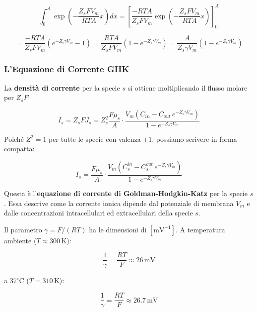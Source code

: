 \begin{equation}
\int_0^A \exp\left(-\frac{Z_s F V_m}{RT A}x\right)dx = \left[\frac{-RT A}{Z_s F V_m}\exp\left(-\frac{Z_s F V_m}{RT A}x\right)\right]_0^A
\end{equation}

\begin{equation}
= \frac{-RT A}{Z_s F V_m}\left(e^{-Z_s \gamma V_m} - 1\right) = \frac{RT A}{Z_s F V_m}\left(1 - e^{-Z_s \gamma V_m}\right) = \frac{A}{Z_s \gamma V_m}\left(1 - e^{-Z_s \gamma V_m}\right)
\end{equation}

\subsubsection{L'Equazione di Corrente GHK}

La \textbf{densità di corrente} per la specie $s$ si ottiene moltiplicando il flusso molare per $Z_s F$:

\begin{equation}
I_s = Z_s F J_s = Z_s^2 \frac{F \mu_s}{A} \cdot \frac{ V_m \left(C_{in} - C_{out}\,e^{-Z_s \gamma V_m}\right)}{1 - e^{-Z_s \gamma V_m}}
\end{equation}

Poiché $Z^2 = 1$ per tutte le specie con valenza $\pm 1$, possiamo scrivere in forma compatta:

\begin{equation}
\boxed{I_s = \frac{F \mu_s}{A} \cdot \frac{ V_m \left(C_s^{in} - C_s^{out}\,e^{-Z_s \gamma V_m}\right)}{1 - e^{-Z_s \gamma V_m}}}
\end{equation}

Questa è l'\textbf{equazione di corrente di Goldman-Hodgkin-Katz} per la specie $s$. Essa descrive come la corrente ionica dipende dal potenziale di membrana $V_m$ e dalle concentrazioni intracellulari ed extracellulari della specie $s$.

Il parametro $\gamma = F/(RT)$ ha le dimensioni di $[\text{mV}^{-1}]$. A temperatura ambiente ($T \approx 300\,\text{K}$):

\begin{equation}
\frac{1}{\gamma} = \frac{RT}{F} \approx 26\,\text{mV}
\end{equation}

a $37^\circ\text{C}$ ($T = 310\,\text{K}$):

\begin{equation}
\frac{1}{\gamma} = \frac{RT}{F} \approx 26.7\,\text{mV}
\end{equation}


